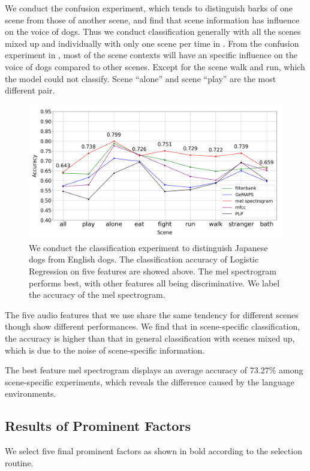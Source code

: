 We conduct the confusion experiment, which tends to distinguish barks of one scene from those of another scene, and find that scene information has influence on the voice of dogs. Thus we conduct classification generally with all the scenes mixed up and individually with only one scene per time in . From the confusion experiment in , most of the scene contexts will have an specific influence on the voice of dogs compared to other scenes. Except for the scene walk and run, which the model could not classify. Scene ``alone'' and scene ``play'' are the most different pair.

\begin{figure}[th]
	\centering
	\includegraphics[width=\columnwidth]{acc.png}
	\caption{We conduct the classification experiment to distinguish Japanese dogs from English dogs. The classification accuracy of Logistic Regression on five features are showed above. The mel spectrogram performs best, with other features all being discriminative. We label the accuracy of the mel spectrogram.}
	\label{fig:acc}
\end{figure}


The five audio features that we use share the same tendency for different scenes though show different performances. We find that in scene-specific classification, the accuracy is higher than that in general classification with scenes mixed up, which is due to the noise of scene-specific information.

The best feature mel spectrogram displays an average accuracy of 73.27\% among scene-specific experiments, which reveals the difference caused by the language environments.



\subsection{Results of Prominent Factors}
\label{sec:prominentfactor}
We select five final prominent factors  as shown in bold  according to the selection routine.

